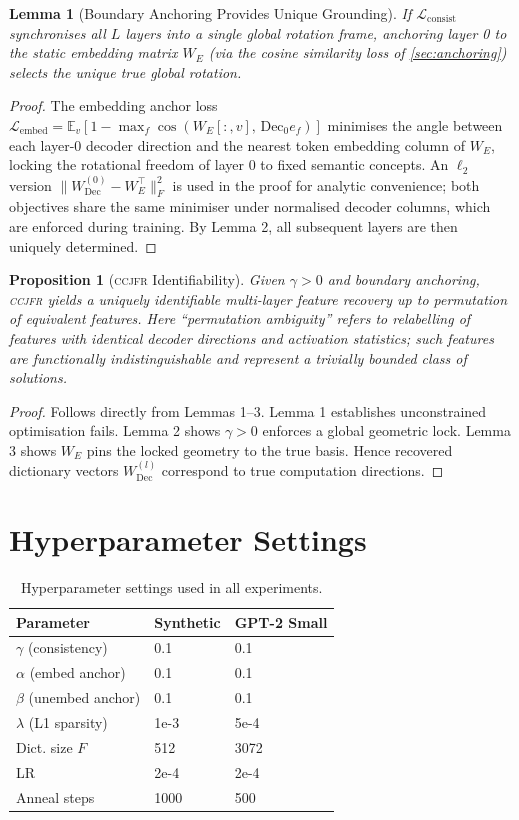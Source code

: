 \documentclass[12pt,a4paper]{article}
\newtheorem{lemma}[theorem]{Lemma}
\newtheorem{proposition}[theorem]{Proposition}
\newcommand{\EE}{\mathbb{E}}
\newcommand{\Dec}{\mathrm{Dec}}
\newcommand{\CCJFR}{\textsc{ccjfr}}
\begin{document}
\begin{lemma}[Boundary Anchoring Provides Unique Grounding]
If $\mathcal{L}_{\mathrm{consist}}$ synchronises all $L$ layers into a single global rotation frame, anchoring layer 0 to the static embedding matrix $W_E$ (via the cosine similarity loss of \cref{sec:anchoring}) selects the unique true global rotation.
\end{lemma}
\begin{proof}
The embedding anchor loss $\mathcal{L}_{\mathrm{embed}} = \EE_{v}[1 - \max_f \cos(W_E[:,v],\, \Dec_0 e_f)]$ minimises the angle between each layer-0 decoder direction and the nearest token embedding column of $W_E$, locking the rotational freedom of layer 0 to fixed semantic concepts. An $\ell_2$ version $\|W_{\Dec}^{(0)} - W_E^\top\|_F^2$ is used in the proof for analytic convenience; both objectives share the same minimiser under normalised decoder columns, which are enforced during training. By Lemma 2, all subsequent layers are then uniquely determined.
\end{proof}

\begin{proposition}[\CCJFR{} Identifiability]
Given $\gamma > 0$ and boundary anchoring, \CCJFR{} yields a uniquely identifiable multi-layer feature recovery up to permutation of equivalent features. Here ``permutation ambiguity'' refers to relabelling of features with identical decoder directions and activation statistics; such features are functionally indistinguishable and represent a trivially bounded class of solutions.
\end{proposition}
\begin{proof}
Follows directly from Lemmas 1--3. Lemma 1 establishes unconstrained optimisation fails. Lemma 2 shows $\gamma > 0$ enforces a global geometric lock. Lemma 3 shows $W_E$ pins the locked geometry to the true basis. Hence recovered dictionary vectors $W_{\Dec}^{(l)}$ correspond to true computation directions.
\end{proof}

\section{Hyperparameter Settings}
\label{app:hyperparams}

\begin{table}[h]
\centering
\caption{Hyperparameter settings used in all experiments.}
\begin{tabular}{lll}
\toprule
Parameter & Synthetic & GPT-2 Small \\
\midrule
$\gamma$ (consistency) & 0.1 & 0.1 \\
$\alpha$ (embed anchor) & 0.1 & 0.1 \\
$\beta$ (unembed anchor) & 0.1 & 0.1 \\
$\lambda$ (L1 sparsity) & 1e-3 & 5e-4 \\
Dict. size $F$ & 512 & 3072 \\
LR & 2e-4 & 2e-4 \\
Anneal steps & 1000 & 500 \\
\bottomrule
\end{tabular}
\end{table}
\end{document}
